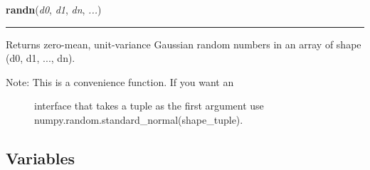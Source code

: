 \hspace{.8\funcindent}\begin{boxedminipage}{\funcwidth}

    \raggedright \textbf{randn}(\textit{d0}, \textit{d1}, \textit{dn}, \textit{...})

    \vspace{-1.5ex}

    \rule{\textwidth}{0.5\fboxrule}
\setlength{\parskip}{2ex}

Returns zero-mean, unit-variance Gaussian random numbers in an
array of shape (d0, d1, ..., dn).
%
\begin{description}
\item[{Note:  This is a convenience function. If you want an}] \leavevmode 
interface that takes a tuple as the first argument
use numpy.random.standard\_normal(shape\_tuple).

\end{description}
\setlength{\parskip}{1ex}
    \end{boxedminipage}



  \subsection{Variables}


